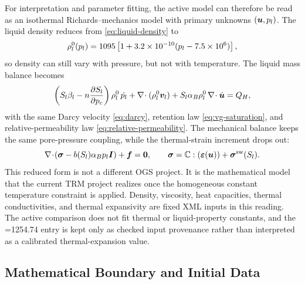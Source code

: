 For interpretation and parameter fitting, the active model can therefore be read as
an isothermal Richards--mechanics model with primary unknowns \((\bm{u},p_l)\).  The
liquid density reduces from \eqref{eq:liquid-density} to
\begin{equation}
  \rho_l^{0}(p_l)
  =
  1095
  \left[
    1
    +3.2\times10^{-10}(p_l-7.5\times10^6)
  \right],
  \label{eq:isothermal-density}
\end{equation}
so density can still vary with pressure, but not with temperature.  The liquid mass
balance becomes
\begin{equation}
\left(
  S_l\beta_l
  - n\frac{\partial S_l}{\partial p_c}
\right)\rho_l^{0}\,\dot{p_l}
+
\nabla\!\cdot(\rho_l^{0}\bm{v}_{l})
+
S_l\alpha_B\rho_l^{0}\,\nabla\!\cdot\dot{\bm{u}}
= Q_H ,
\label{eq:isothermal-mass-balance}
\end{equation}
with the same Darcy velocity \eqref{eq:darcy}, retention law
\eqref{eq:vg-saturation}, and relative-permeability law
\eqref{eq:relative-permeability}.  The mechanical balance keeps the same
pore-pressure coupling, while the thermal-strain increment drops out:
\begin{equation}
  \nabla\!\cdot\!\left(\bm{\sigma} - b(S_l)\alpha_Bp_l\bm{I}\right) + \bm{f} = \bm{0},
  \qquad
  \bm{\sigma}
  =
  \mathbb{C}:
  \left(
    \bm{\varepsilon}(\bm{u})
  \right)
  + \bm{\sigma}^{\mathrm{sw}}(S_l).
  \label{eq:isothermal-mechanics}
\end{equation}
This reduced form is not a different OGS project.  It is the mathematical model that
the current TRM project realizes once the homogeneous constant temperature
constraint is applied.  Density, viscosity, heat capacities, thermal conductivities,
and thermal expansivity are fixed XML inputs in this reading.  The active comparison
does not fit thermal or liquid-property constants, and the =1254.74 entry
is kept only as checked input provenance rather than interpreted as a calibrated
thermal-expansion value.

\subsection{Mathematical Boundary and Initial Data}
\label{sec:mathematical-boundary-initial}

